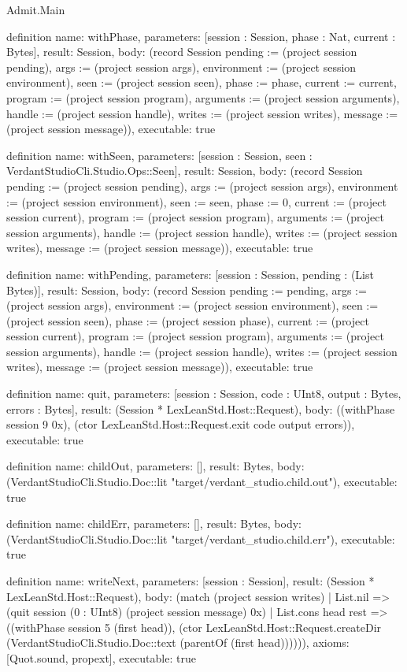 \begin{lexlean}{Admit.Main}
\begin{semanticmodule}
definition{
  name: withPhase,
  parameters: [session : Session, phase : Nat, current : Bytes],
  result: Session,
  body: (record Session {pending := (project session pending), args := (project session args), environment := (project session environment), seen := (project session seen), phase := phase, current := current, program := (project session program), arguments := (project session arguments), handle := (project session handle), writes := (project session writes), message := (project session message)}),
  executable: true
}

definition{
  name: withSeen,
  parameters: [session : Session, seen : VerdantStudioCli.Studio.Ops::Seen],
  result: Session,
  body: (record Session {pending := (project session pending), args := (project session args), environment := (project session environment), seen := seen, phase := 0, current := (project session current), program := (project session program), arguments := (project session arguments), handle := (project session handle), writes := (project session writes), message := (project session message)}),
  executable: true
}

definition{
  name: withPending,
  parameters: [session : Session, pending : (List Bytes)],
  result: Session,
  body: (record Session {pending := pending, args := (project session args), environment := (project session environment), seen := (project session seen), phase := (project session phase), current := (project session current), program := (project session program), arguments := (project session arguments), handle := (project session handle), writes := (project session writes), message := (project session message)}),
  executable: true
}


definition{
  name: quit,
  parameters: [session : Session, code : UInt8, output : Bytes, errors : Bytes],
  result: (Session * LexLeanStd.Host::Request),
  body: ((withPhase session 9 0x), (ctor LexLeanStd.Host::Request.exit code output errors)),
  executable: true
}

definition{
  name: childOut,
  parameters: [],
  result: Bytes,
  body: (VerdantStudioCli.Studio.Doc::lit "target/verdant_studio.child.out"),
  executable: true
}

definition{
  name: childErr,
  parameters: [],
  result: Bytes,
  body: (VerdantStudioCli.Studio.Doc::lit "target/verdant_studio.child.err"),
  executable: true
}

definition{
  name: writeNext,
  parameters: [session : Session],
  result: (Session * LexLeanStd.Host::Request),
  body: (match (project session writes)
    | List.nil => (quit session (0 : UInt8) (project session message) 0x)
    | List.cons head rest => ((withPhase session 5 (first head)), (ctor LexLeanStd.Host::Request.createDir (VerdantStudioCli.Studio.Doc::text (parentOf (first head)))))),
  axioms: [Quot.sound, propext],
  executable: true
}


\end{semanticmodule}
\end{lexlean}

